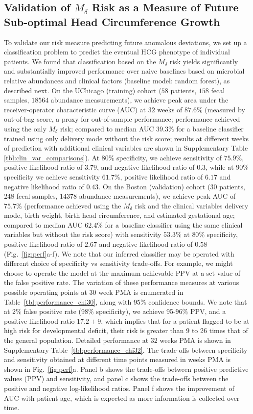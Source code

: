 \documentclass[onecolumn,10pt]{IEEEtran}
\def\erisk{$M_\delta$\xspace}
\def\SPREFIX{S-}
\def\SPREFIX{}
\def\SUPPLEMENTARY{Supplementary\xspace}
\begin{document}
\subsection*{Validation of \erisk Risk as a Measure of Future Sub-optimal Head Circumference Growth}
To validate our risk measure predicting future anomalous deviations, we set up a classification problem to predict the eventual HCG phenotype of individual patients. We found that classification based on the \erisk risk  yields significantly and substantially improved performance over naive baselines based on microbial relative abundances and clinical factors (baseline model: random forest), as described next. On the UChicago (training) cohort ($58$ patients, $158$ fecal samples, $18564$ abundance measurements), we achieve peak area under the receiver-operator characteristic curve (AUC) at $32$ weeks of $87.6\%$ (measured by out-of-bag score, a proxy for out-of-sample performance; performance achieved using the only \erisk risk; compared to median AUC $39.3\%$ for a baseline classifier trained using only delivery mode without the risk score; results at different weeks of prediction with additional clinical variables are shown in \SUPPLEMENTARY Table \ref{tbl:clin_var_comparisons}). At $80\%$ specificity, we achieve sensitivity of $75.9\%$, positive likelihood ratio of $3.79$, and negative likelihood ratio of $0.3$, while at $90\%$ specificity we achieve sensitivity $61.7\%$, positive likelihood ratio of $6.17$ and negative likelihood ratio of $0.43$.  On the Boston (validation) cohort ($30$ patients, $248$ fecal samples, $14378$ abundance measurements), we achieve peak AUC of $75.7\%$ (performance achieved using the \erisk risk and the clinical variables delivery mode, birth weight, birth head circumference, and estimated gestational age; compared to median AUC $62.4\%$ for a baseline classifier using the same clinical variables but without the risk score) with sensitivity $53.3\%$ at $80\%$ specificity, positive likelihood ratio of $2.67$ and negative likelihood ratio of $0.58$ (Fig.~\ref{fig:perf}a-f). We note that our inferred classifier may be operated with different choice of specificity vs sensitivity trade-offs. For example, we might choose to operate the model at the maximum achievable PPV at a  set value of the false positive rate. The variation of these performance measures at various possible operating points at 30 week PMA  is enumerated in Table~\ref{tbl:performance_chi30}, along with 95\% confidence bounds. We note that at 2\% false positive rate (98\% specificity), we achieve 95-96\% PPV, and a positive likelihood ratio $17.2 \pm 9$, which implies that for a patient flagged to be at high risk for developmental deficit, their risk is greater than 9 to 26 times that of the general population. Detailed performance at 32 weeks PMA is shown in \SUPPLEMENTARY Table\SPREFIX~\ref{tbl:performance_chi32}. The trade-offs between specificity and sensitivity obtained at different time points measured in weeks PMA is shown in Fig.~\ref{fig:perf}a. Panel b shows the trade-offs between positive predictive values (PPV) and sensitivity, and panel c shows the trade-offs between the positive and negative log-likelihood ratios. Panel f shows the  improvement of AUC with patient age, which is expected as more information is collected over time. 
\end{document}
